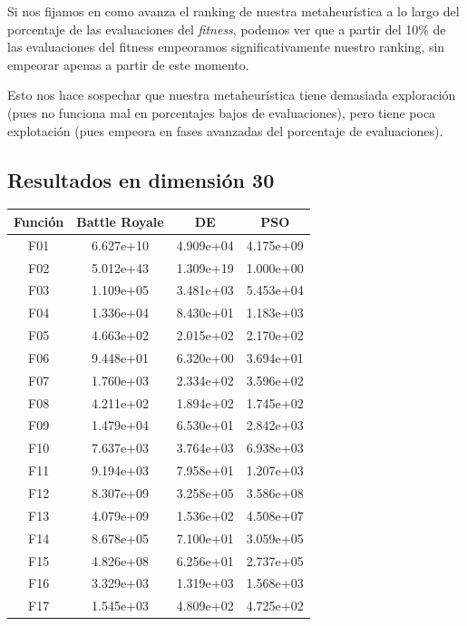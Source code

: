 \documentclass[11pt]{article}
\begin{document}
Si nos fijamos en como avanza el ranking de nuestra metaheurística a lo largo del porcentaje de las evaluaciones del \emph{fitness}, podemos ver que a partir del 10\% de las evaluaciones del fitness empeoramos significativamente nuestro ranking, sin empeorar apenas a partir de este momento.

Esto nos hace sospechar que nuestra metaheurística tiene demasiada exploración (pues no funciona mal en porcentajes bajos de evaluaciones), pero tiene poca explotación (pues empeora en fases avanzadas del porcentaje de evaluaciones).

\subsection{Resultados en dimensión 30}

\begin{table}[H]
\centering
\begin{tabular}{|c|c|c|c|}
\hline
\textbf{Función} & \textbf{Battle Royale} &         \textbf{DE} &        \textbf{PSO} \\
\hline
F01  &     6.627e+10 &  4.909e+04 &  4.175e+09 \\
F02  &     5.012e+43 &  1.309e+19 &  1.000e+00 \\
F03  &     1.109e+05 &  3.481e+03 &  5.453e+04 \\
F04  &     1.336e+04 &  8.430e+01 &  1.183e+03 \\
F05  &     4.663e+02 &  2.015e+02 &  2.170e+02 \\
F06  &     9.448e+01 &  6.320e+00 &  3.694e+01 \\
F07  &     1.760e+03 &  2.334e+02 &  3.596e+02 \\
F08  &     4.211e+02 &  1.894e+02 &  1.745e+02 \\
F09  &     1.479e+04 &  6.530e+01 &  2.842e+03 \\
F10  &     7.637e+03 &  3.764e+03 &  6.938e+03 \\
F11  &     9.194e+03 &  7.958e+01 &  1.207e+03 \\
F12  &     8.307e+09 &  3.258e+05 &  3.586e+08 \\
F13  &     4.079e+09 &  1.536e+02 &  4.508e+07 \\
F14  &     8.678e+05 &  7.100e+01 &  3.059e+05 \\
F15  &     4.826e+08 &  6.256e+01 &  2.737e+05 \\
F16  &     3.329e+03 &  1.319e+03 &  1.568e+03 \\
F17  &     1.545e+03 &  4.809e+02 &  4.725e+02 \\

\end{tabular}
\end{table}
\end{document}

